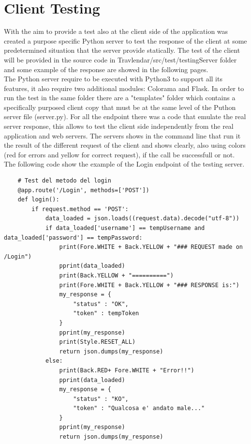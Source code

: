 \documentclass[numbers=noenddot, 12pt, a4paper, oneside]{scrbook}
\begin{document}
\section*{Client Testing}
With the aim to provide a test also at the client side of the application was created a purpose specific Python server to test the response of the client at some predetermined situation that the server provide statically. 
The test of the client will be provided in the source code in Travlendar/src/test/testingServer folder and some example of the response are showed in the following pages. \\\newline
The Python server require to be executed with Python3 to support all its features, it also require two additional modules: Colorama and Flask.
In order to run the test in the same folder there are a "templates" folder which contains a specifically purposed client copy that must be at the same level of the Puthon server file (server.py).
For all the endpoint there was a code that emulate the real server response, this allows to test the client side independently from the real application and web servers.
The servers shows in the command line that run it the result of the different request of the client and shows clearly, also using colors (red for errors and yellow for correct request), if the call be successfull or not. \\\newline
The following code show the example of the Login endpoint of the testing server.

\lstset{language=Python}
\begin{lstlisting}
	# Test del metodo del login
	@app.route('/Login', methods=['POST'])
	def login():
		if request.method == 'POST':
			data_loaded = json.loads((request.data).decode("utf-8"))
			if data_loaded['username'] == tempUsername and data_loaded['password'] == tempPassword:
				print(Fore.WHITE + Back.YELLOW + "### REQUEST made on /Login")
				pprint(data_loaded)
				print(Back.YELLOW + "==========")
				print(Fore.WHITE + Back.YELLOW + "### RESPONSE is:")
				my_response = {
					"status" : "OK",
					"token" : tempToken
				}
				pprint(my_response)
				print(Style.RESET_ALL)
				return json.dumps(my_response)
			else:
				print(Back.RED+ Fore.WHITE + "Error!!")
				pprint(data_loaded)
				my_response = {
					"status" : "KO",
					"token" : "Qualcosa e' andato male..."
				}
				pprint(my_response)
				return json.dumps(my_response)
\end{lstlisting}
\end{document}
